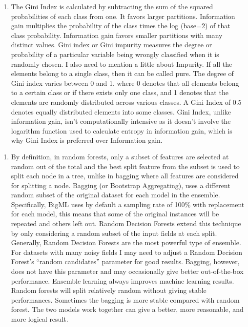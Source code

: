 \documentclass[11pt]{article}
\providecommand{\tightlist}{%
      \setlength{\itemsep}{0pt}\setlength{\parskip}{0pt}}
\begin{document}
    \begin{enumerate}
\def\labelenumi{\alph{enumi})}
\setcounter{enumi}{2}
\tightlist
\item
  The Gini Index is calculated by subtracting the sum of the squared
  probabilities of each class from one. It favors larger partitions.
  Information gain multiplies the probability of the class times the log
  (base=2) of that class probability. Information gain favors smaller
  partitions with many distinct values. Gini index or Gini impurity
  measures the degree or probability of a particular variable being
  wrongly classified when it is randomly chosen. I also need to mention
  a little about Impurity. If all the elements belong to a single class,
  then it can be called pure. The degree of Gini index varies between 0
  and 1, where 0 denotes that all elements belong to a certain class or
  if there exists only one class, and 1 denotes that the elements are
  randomly distributed across various classes. A Gini Index of 0.5
  denotes equally distributed elements into some classes. Gini Index,
  unlike information gain, isn't computationally intensive as it doesn't
  involve the logarithm function used to calculate entropy in
  information gain, which is why Gini Index is preferred over
  Information gain.
\end{enumerate}

    \begin{enumerate}
\def\labelenumi{\alph{enumi})}
\setcounter{enumi}{3}
\tightlist
\item
  By definition, in random forests, only a subset of features are
  selected at random out of the total and the best split feature from
  the subset is used to split each node in a tree, unlike in bagging
  where all features are considered for splitting a node. Bagging (or
  Bootstrap Aggregating), uses a different random subset of the original
  dataset for each model in the ensemble. Specifically, BigML uses by
  default a sampling rate of 100\% with replacement for each model, this
  means that some of the original instances will be repeated and others
  left out. Random Decision Forests extend this technique by only
  considering a random subset of the input fields at each split.
  Generally, Random Decision Forests are the most powerful type of
  ensemble. For datasets with many noisy fields I may need to adjust a
  Random Decision Forest's ``random candidates'' parameter for good
  results. Bagging, however, does not have this parameter and may
  occasionally give better out-of-the-box performance. Ensemble learning
  always improves machine learning results. Random forests will split
  relatively random without giving stable performances. Sometimes the
  bagging is more stable compared with random forest. The two models
  work together can give a better, more reasonable, and more logical
  result.
\end{enumerate}
\end{document}
